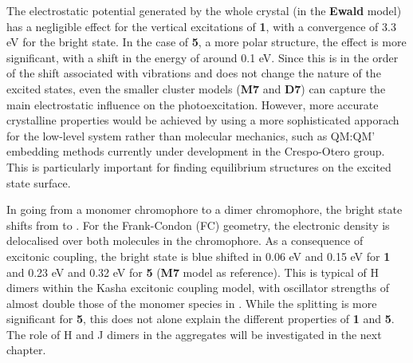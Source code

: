 The electrostatic potential generated by the whole crystal (in the \textbf{Ewald} model) has a negligible effect for the vertical excitations of \textbf{1}, with a convergence of 3.3 eV for the bright state. In the case of \textbf{5}, a more polar structure, the effect is more significant, with a shift in the energy of around 0.1 eV. Since this is in the order of the shift associated with vibrations and does not change the nature of the excited states, even the smaller cluster models (\textbf{M7} and \textbf{D7}) can capture the main electrostatic influence on the photoexcitation.\cite{Crespo-Otero2012} However, more accurate crystalline properties would be achieved by using a more sophisticated apporach for the low-level system rather than molecular mechanics, such as QM:QM' embedding methods currently under development in the Crespo-Otero group. This is particularly important for finding equilibrium structures on the excited state surface.

In going from a monomer chromophore to a dimer chromophore, the bright state shifts from \sone{} to \stwo.  For the Frank-Condon (FC) geometry, the electronic density is delocalised over both molecules in the chromophore. As a consequence of  excitonic coupling, the bright state is blue shifted in 0.06 eV and 0.15 eV  for \textbf{1} and 0.23 eV and 0.32 eV for \textbf{5} (\textbf{M7} model as reference). This is typical of H dimers within the Kasha excitonic coupling model, with oscillator strengths of \stwo{} almost double those of the monomer species in \sone.\cite{Kasha1965a} While the splitting is more significant for \textbf{5}, this does not alone explain the different properties of \textbf{1} and \textbf{5}. The role of H and J dimers in the aggregates will be investigated in the next chapter.

